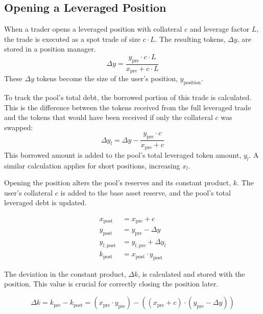 \documentclass[11pt]{article}
\begin{document}
\subsection{Opening a Leveraged Position}

When a trader opens a leveraged position with collateral $c$ and leverage factor $L$, the trade is executed as a spot trade of size $c \cdot L$. The resulting tokens, $\Delta y$, are stored in a position manager.
\begin{equation}
\Delta y = \frac{y_{\text{pre}} \cdot c \cdot L}{x_{\text{pre}} + c \cdot L}
\end{equation}
These $\Delta y$ tokens become the size of the user's position, $y_{\text{position}}$.

To track the pool's total debt, the borrowed portion of this trade is calculated. This is the difference between the tokens received from the full leveraged trade and the tokens that would have been received if only the collateral $c$ was swapped:
\begin{equation}
\Delta y_l = \Delta y - \frac{y_{\text{pre}} \cdot c}{x_{\text{pre}} + c}
\end{equation}
This borrowed amount is added to the pool's total leveraged token amount, $y_l$. A similar calculation applies for short positions, increasing $x_l$.

Opening the position alters the pool's reserves and its constant product, $k$. The user's collateral $c$ is added to the base asset reserve, and the pool's total leveraged debt is updated.

\begin{equation}
\begin{aligned}
x_{\text{post}} &= x_{\text{pre}} + c \\
y_{\text{post}} &= y_{\text{pre}} - \Delta y \\
y_{l, \text{post}} &= y_{l, \text{pre}} + \Delta y_l \\
k_{\text{post}} &= x_{\text{post}} \cdot y_{\text{post}}
\end{aligned}
\end{equation}

The deviation in the constant product, $\Delta k$, is calculated and stored with the position. This value is crucial for correctly closing the position later.

\begin{equation}
\Delta k = k_{\text{pre}} - k_{\text{post}} = (x_{\text{pre}} \cdot y_{\text{pre}}) - ((x_{\text{pre}} + c) \cdot (y_{\text{pre}} - \Delta y))
\end{equation}
\end{document}
